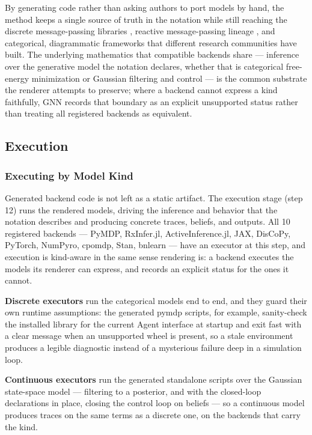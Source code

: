 \documentclass[
  english,
  9pt,
]{extarticle}
\begin{document}
By generating code rather than asking authors to port models by hand,
the method keeps a single source of truth in the notation while still
reaching the discrete message-passing libraries \citep{heins2022},
reactive message-passing lineage
\citep{bagaev2021reactiveMessagePassing}, and categorical, diagrammatic
frameworks \citep{defelice2021} that different research communities have
built. The underlying mathematics that compatible backends share ---
inference over the generative model the notation declares, whether that
is categorical free-energy minimization \citep{dacosta2020, smith2022}
or Gaussian filtering and control --- is the common substrate the
renderer attempts to preserve; where a backend cannot express a kind
faithfully, GNN records that boundary as an explicit unsupported status
rather than treating all registered backends as equivalent.

\subsection{Execution}\label{execution}

\subsubsection{Executing by Model Kind}\label{executing-by-model-kind}

Generated backend code is not left as a static artifact. The execution
stage (step 12) runs the rendered models, driving the inference and
behavior that the notation describes and producing concrete traces,
beliefs, and outputs. All 10 registered backends --- PyMDP, RxInfer.jl,
ActiveInference.jl, JAX, DisCoPy, PyTorch, NumPyro, cpomdp, Stan,
bnlearn --- have an executor at this step, and execution is kind-aware
in the same sense rendering is: a backend executes the models its
renderer can express, and records an explicit status for the ones it
cannot.

\textbf{Discrete executors} run the categorical models end to end, and
they guard their own runtime assumptions: the generated pymdp scripts,
for example, sanity-check the installed library for the current Agent
interface at startup and exit fast with a clear message when an
unsupported wheel is present, so a stale environment produces a legible
diagnostic instead of a mysterious failure deep in a simulation loop.

\textbf{Continuous executors} run the generated standalone scripts over
the Gaussian state-space model --- filtering to a posterior, and with
the closed-loop declarations in place, closing the control loop on
beliefs --- so a continuous model produces traces on the same terms as a
discrete one, on the backends that carry the kind.
\end{document}
